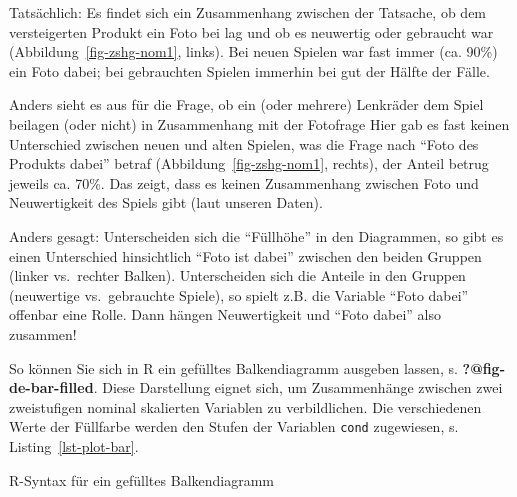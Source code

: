 \documentclass[
  letterpaper,
]{scrbook}
\newenvironment{Shaded}{\begin{snugshade}}{\end{snugshade}}
\newcommand{\AttributeTok}[1]{\textcolor[rgb]{0.40,0.45,0.13}{#1}}
\newcommand{\CommentTok}[1]{\textcolor[rgb]{0.37,0.37,0.37}{#1}}
\newcommand{\FunctionTok}[1]{\textcolor[rgb]{0.28,0.35,0.67}{#1}}
\newcommand{\NormalTok}[1]{\textcolor[rgb]{0.00,0.23,0.31}{#1}}
\newcommand{\SpecialCharTok}[1]{\textcolor[rgb]{0.37,0.37,0.37}{#1}}
\newcommand{\StringTok}[1]{\textcolor[rgb]{0.13,0.47,0.30}{#1}}
\theoremstyle{definition}
\theoremstyle{definition}
\theoremstyle{definition}
\theoremstyle{remark}
\begin{document}
Tatsächlich: Es findet sich ein Zusammenhang zwischen der Tatsache, ob
dem versteigerten Produkt ein Foto bei lag und ob es neuwertig oder
gebraucht war (Abbildung~\ref{fig-zshg-nom1}, links). Bei neuen Spielen
war fast immer (ca. 90\%) ein Foto dabei; bei gebrauchten Spielen
immerhin bei gut der Hälfte der Fälle.

Anders sieht es aus für die Frage, ob ein (oder mehrere) Lenkräder dem
Spiel beilagen (oder nicht) in Zusammenhang mit der Fotofrage Hier gab
es fast keinen Unterschied zwischen neuen und alten Spielen, was die
Frage nach \enquote{Foto des Produkts dabei} betraf
(Abbildung~\ref{fig-zshg-nom1}, rechts), der Anteil betrug jeweils ca.
70\%. Das zeigt, dass es keinen Zusammenhang zwischen Foto und
Neuwertigkeit des Spiels gibt (laut unseren Daten).

Anders gesagt: Unterscheiden sich die \enquote{Füllhöhe} in den
Diagrammen, so gibt es einen Unterschied hinsichtlich \enquote{Foto ist
dabei} zwischen den beiden Gruppen (linker vs.~rechter Balken).
Unterscheiden sich die Anteile in den Gruppen (neuwertige vs.~gebrauchte
Spiele), so spielt z.B. die Variable \enquote{Foto dabei} offenbar eine
Rolle. Dann hängen Neuwertigkeit und \enquote{Foto dabei} also zusammen!

So können Sie sich in R ein gefülltes Balkendiagramm ausgeben lassen, s.
\textbf{?@fig-de-bar-filled}. Diese Darstellung eignet sich, um
Zusammenhänge zwischen zwei zweistufigen nominal skalierten Variablen zu
verbildlichen. Die verschiedenen Werte der Füllfarbe werden den Stufen
der Variablen \texttt{cond} zugewiesen, s. Listing~\ref{lst-plot-bar}.

\begin{codelisting}

\caption{\label{lst-plot-bar}R-Syntax für ein gefülltes Balkendiagramm}

\centering{

\begin{Shaded}
\begin{Highlighting}[]
\NormalTok{mariokart }\SpecialCharTok{\%\textgreater{}\%} 
  \FunctionTok{select}\NormalTok{(cond, stock\_photo) }\SpecialCharTok{\%\textgreater{}\%} 
  \FunctionTok{plot\_bar}\NormalTok{(}\AttributeTok{by =} \StringTok{"cond"}\NormalTok{)  }\CommentTok{\# aus dem Paket DataExplorer}
\end{Highlighting}
\end{Shaded}

}

\end{codelisting}%
\end{document}
